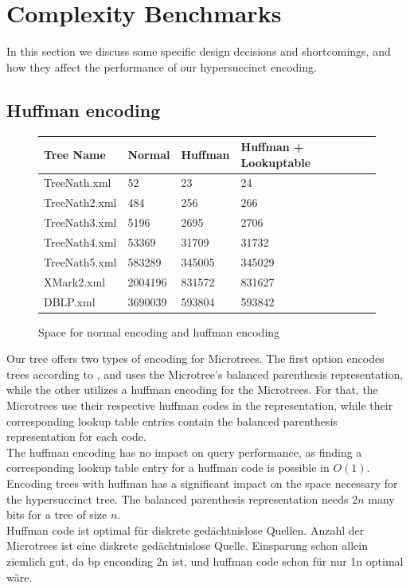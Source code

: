 \documentclass{article}
\begin{document}
\section{Complexity Benchmarks}
In this section we discuss some specific design decisions and shortcomings, and how they affect the performance of our hypersuccinct encoding.
\subsection{Huffman encoding}
\begin{figure}[h]
	\begin{tabular}{ |p{3cm}||p{2cm}|p{2cm}|p{4cm}|  }
		 \hline
		 Tree Name & Normal &Huffman &Huffman + Lookuptable\\
		 \hline
		 TreeNath.xml   & 52    & 23 &   24 \\
		 TreeNath2.xml&   484  & 256   & 266 \\
		 TreeNath3.xml&5196 &2695&  2706\\
		 TreeNath4.xml&53369& 31709&  31732\\
		 TreeNath5.xml&583289&345005&345029\\
		 XMark2.xml&2004196&831572&831627\\
		 DBLP.xml&3690039&593804&593842\\
		 \hline
	\end{tabular}
\caption{Space for normal encoding and huffman encoding}
\label{huff:table1}
\end{figure}
Our tree offers two types of encoding for Microtrees. The first option encodes trees according to \cite{farzanMunro}, and uses the Microtree's balanced parenthesis representation, while the other utilizes a huffman encoding for the Microtrees. For that, the Microtrees use their respective huffman codes in the representation, while their corresponding lookup table entries contain the balanced parenthesis representation for each code.\\
The huffman encoding has no impact on query performance, as finding a corresponding lookup table entry for a huffman code is possible in $O(1)$. Encoding trees with huffman has a significant impact on the space necessary for the hypersuccinct tree. The balanced parenthesis representation needs $2n$ many bits for a tree of size $n$.\\
Huffman code ist optimal für diskrete gedächtnislose Quellen. Anzahl der Microtrees ist eine diskrete gedächtnislose Quelle. Einsparung schon allein ziemlich gut, da bp enconding 2n ist, und huffman code schon für nur 1n optimal wäre. %
\end{document}
